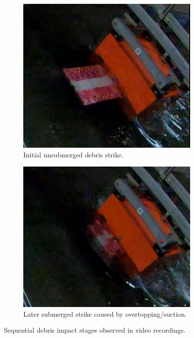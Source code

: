 \documentclass{article}
\begin{document}
\begin{figure}[htbp]
    \centering
    \begin{subfigure}{0.48\textwidth}
        \includegraphics[width=\linewidth]{first_impact.jpg}
        \caption{Initial unsubmerged debris strike.}
    \end{subfigure}
    \hfill
    \begin{subfigure}{0.48\textwidth}
        \includegraphics[width=\linewidth]{second_impact.jpg}
        \caption{Later submerged strike caused by overtopping/suction.}
    \end{subfigure}
    \caption{Sequential debris impact stages observed in video recordings.}
    \label{fig:video_impacts}
\end{figure}
\end{document}
